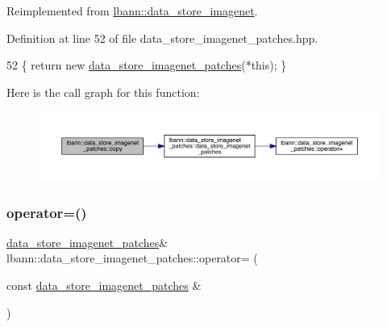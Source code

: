Reimplemented from \hyperlink{classlbann_1_1data__store__imagenet_ae3b0d31ac020c36f41766999288e2d25}{lbann\+::data\+\_\+store\+\_\+imagenet}.



Definition at line 52 of file data\+\_\+store\+\_\+imagenet\+\_\+patches.\+hpp.


\begin{DoxyCode}
52 \{ \textcolor{keywordflow}{return} \textcolor{keyword}{new} \hyperlink{classlbann_1_1data__store__imagenet__patches_ac98e8ba382516df619d24e67881df1eb}{data\_store\_imagenet\_patches}(*\textcolor{keyword}{this}); \}
\end{DoxyCode}
Here is the call graph for this function\+:\nopagebreak
\begin{figure}[H]
\begin{center}
\leavevmode
\includegraphics[width=350pt]{classlbann_1_1data__store__imagenet__patches_a5067e8299f5cf073497a5005ee9db759_cgraph}
\end{center}
\end{figure}
\mbox{\label{classlbann_1_1data__store__imagenet__patches_a0a2e0ecbd10a65b02019ce9e816f88dd}} 
\subsubsection{\texorpdfstring{operator=()}{operator=()}}
{\footnotesize\ttfamily \hyperlink{classlbann_1_1data__store__imagenet__patches}{data\+\_\+store\+\_\+imagenet\+\_\+patches}\& lbann\+::data\+\_\+store\+\_\+imagenet\+\_\+patches\+::operator= (\begin{DoxyParamCaption}\item[{const \hyperlink{classlbann_1_1data__store__imagenet__patches}{data\+\_\+store\+\_\+imagenet\+\_\+patches} \&}]{ }\end{DoxyParamCaption})\hspace{0.3cm}{\ttfamily [default]}}



